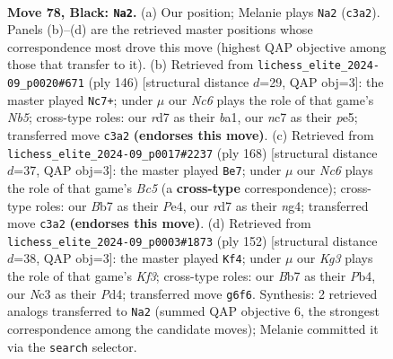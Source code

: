 \documentclass[11pt]{article}
\begin{document}
\clearpage

\begin{figure}[p]\centering
\begin{subfigure}{0.46\textwidth}\centering
\resizebox{\linewidth}{!}{%
\newchessgame
\chessboard[
  setfen={8/PbNR4/6k1/8/1p3P2/2n3PB/7P/4K3 b - - 25 78},
  showmover=false,
  pgfstyle=straightmove, color=movearrow, markmove={c3-a2}
]}
\caption{}
\end{subfigure}\hfill
\begin{subfigure}{0.46\textwidth}\centering
\resizebox{\linewidth}{!}{%
\newchessgame
\chessboard[
  setfen={8/5p2/6pB/1N1kp2p/8/3K3P/6P1/b7 w - - 12 74},
  showmover=false,
  pgfstyle=straightmove, color=movearrow, markmove={b5-c7}
]}
\caption{}
\end{subfigure}
\\[4pt]
\begin{subfigure}{0.46\textwidth}\centering
\resizebox{\linewidth}{!}{%
\newchessgame
\chessboard[
  setfen={8/2k5/p7/2B1p2p/P3P1nP/8/4K3/8 w - - 46 85},
  showmover=false,
  pgfstyle=straightmove, color=movearrow, markmove={c5-e7}
]}
\caption{}
\end{subfigure}\hfill
\begin{subfigure}{0.46\textwidth}\centering
\resizebox{\linewidth}{!}{%
\newchessgame
\chessboard[
  setfen={8/3bk3/2p3Bp/1p1p4/1P1P3P/5K2/8/8 w - - 12 77},
  showmover=false,
  pgfstyle=straightmove, color=movearrow, markmove={f3-f4}
]}
\caption{}
\end{subfigure}
\caption{\textbf{Move 78, Black: \texttt{Na2}.} (a) Our position; Melanie plays \texttt{Na2} (\texttt{c3a2}). Panels (b)--(d) are the retrieved master positions whose correspondence most drove this move (highest QAP objective among those that transfer to it). (b) Retrieved from \texttt{lichess\_elite\_2024-09\_p0020\#671} (ply 146) [structural distance $d$=29, QAP obj=3]: the master played \texttt{Nc7+}; under $\mu$ our \emph{Nc6} plays the role of that game's \emph{Nb5}; cross-type roles: our \emph{r}d7 as their \emph{b}a1, our \emph{n}c7 as their \emph{p}e5; transferred move \texttt{c3a2} \textbf{(endorses this move)}. (c) Retrieved from \texttt{lichess\_elite\_2024-09\_p0017\#2237} (ply 168) [structural distance $d$=37, QAP obj=3]: the master played \texttt{Be7}; under $\mu$ our \emph{Nc6} plays the role of that game's \emph{Bc5} (a \textbf{cross-type} correspondence); cross-type roles: our \emph{B}b7 as their \emph{P}e4, our \emph{r}d7 as their \emph{n}g4; transferred move \texttt{c3a2} \textbf{(endorses this move)}. (d) Retrieved from \texttt{lichess\_elite\_2024-09\_p0003\#1873} (ply 152) [structural distance $d$=38, QAP obj=3]: the master played \texttt{Kf4}; under $\mu$ our \emph{Kg3} plays the role of that game's \emph{Kf3}; cross-type roles: our \emph{B}b7 as their \emph{P}b4, our \emph{N}c3 as their \emph{P}d4; transferred move \texttt{g6f6}. Synthesis: 2 retrieved analogs transferred to \texttt{Na2} (summed QAP objective 6, the strongest correspondence among the candidate moves); Melanie committed it via the \texttt{search} selector.}
\label{fig:thought-m155}
\end{figure}
\end{document}
